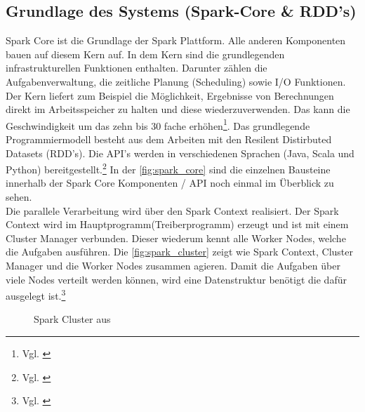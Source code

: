 \newpage
\subsection{Grundlage des Systems (Spark-Core \& RDD’s)}\label{sec_sparkcore}
Spark Core ist die Grundlage der Spark Plattform. Alle anderen Komponenten bauen auf diesem Kern auf. In dem Kern sind die grundlegenden infrastrukturellen Funktionen enthalten. Darunter zählen die Aufgabenverwaltung, die zeitliche Planung (Scheduling) sowie I/O Funktionen.
Der Kern liefert zum Beispiel die Möglichkeit, Ergebnisse von Berechnungen direkt im Arbeitsspeicher zu halten und diese wiederzuverwenden. Das kann die Geschwindigkeit um das zehn bis 30 fache erhöhen\footnote{Vgl. \cite{VYL+16}}. 
Das grundlegende Programmiermodell besteht aus dem Arbeiten mit den Resilent Distirbuted Datasets (RDD's). Die API's werden in verschiedenen Sprachen (Java, Scala und Python) bereitgestellt.\footnote{Vgl. \cite{DATABRICK_ABOUT}} In der \autoref{fig:spark_core} sind die einzelnen Bausteine innerhalb der Spark Core Komponenten / API noch einmal im Überblick zu sehen. \\
 

\noindent
Die parallele Verarbeitung wird über den Spark Context realisiert. Der Spark Context wird im Hauptprogramm(Treiberprogramm) erzeugt und ist mit einem Cluster Manager verbunden. Dieser wiederum kennt alle Worker Nodes, welche die Aufgaben ausführen. Die \autoref{fig:spark_cluster} zeigt wie Spark Context, Cluster Manager und die Worker Nodes zusammen agieren. Damit die Aufgaben über viele Nodes verteilt werden können, wird eine Datenstruktur benötigt die dafür ausgelegt ist.\footnote{Vgl. \cite[101]{BDS16}}

\begin{figure}[h]
  \centering
  \caption{Spark Cluster aus \cite{SPCLUSTER}}\label{fig:spark_cluster}
\end{figure}



